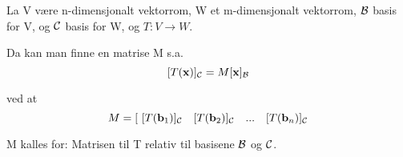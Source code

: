 La V være n-dimensjonalt vektorrom, W et m-dimensjonalt vektorrom,
$\mathcal{B}$ basis for V, og $\mathcal{C}$ basis for W,
og $T: V \to W$.

Da kan man finne en matrise M s.a.
$$[T(\mathbf{x})]_{\mathcal{C}} = M [\mathbf{x}]_{\mathcal{B}}$$

ved at
$$M = [\ [T(\mathbf{b}_1)]_{\mathcal{C}} \quad [T(\mathbf{b}_2)]_{\mathcal{C}} \quad ... \quad [T(\mathbf{b}_n)]_{\mathcal{C}}$$

M kalles for: Matrisen til T relativ til basisene $\mathcal{B}$ og $\mathcal{C}$.
